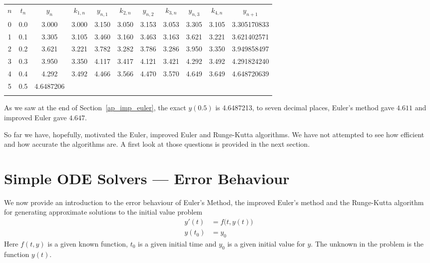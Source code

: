 \begin{center}
\def\arraystretch{1.25}%
\begin{tabular}{ !{\vrule width 1.5pt} c !{\vrule width 1pt} c | c | c | c |c | c | c | c | c | c  !{\vrule width 1.5pt}}
$n$ & $t_n$ & $y_n$ & $k_{1,n}$ & $y_{n,1}$ & $k_{2,n}$ & $y_{n,2}$ & 
       $k_{3,n}$ & $y_{n,3}$ & $k_{4,n}$ & $y_{n+1}$ \\
  0 & 0.0 & 3.000 & 3.000 & 3.150 & 3.050 & 3.153 & 3.053 & 3.305 & 3.105 & 3.305170833  \\
 & 0.1 & 3.305 & 3.105 & 3.460 & 3.160 & 3.463 & 3.163 & 3.621 & 3.221 & 3.621402571  \\
 & 0.2 & 3.621 & 3.221 & 3.782 & 3.282 & 3.786 & 3.286 & 3.950 & 3.350 & 3.949858497 \\
 & 0.3 & 3.950 & 3.350 & 4.117 & 3.417 & 4.121 & 3.421 & 4.292 & 3.492 & 4.291824240 \\
 & 0.4 & 4.292 & 3.492 & 4.466 & 3.566 & 4.470 & 3.570 & 4.649 & 3.649 & 4.648720639 \\
 & 0.5 & 4.6487206 &  & &  &  &  &  &  &   \\
\end{tabular}
\def\arraystretch{1.0}%
\end{center}
\bigskip
As we saw at the end of Section~\ref{ap_imp_euler}, the exact $y(0.5)$ is
4.6487213, to seven decimal places, Euler's method gave $4.611$ and improved Euler gave $4.647$.

So far we have, hopefully, motivated the Euler, improved Euler and Runge-Kutta
algorithms. We have not attempted to see how efficient and how accurate
the algorithms are. A first look at those questions is provided in the
next section.

\section{Simple ODE Solvers --- Error Behaviour}
We now provide an introduction to the error behaviour of 
Euler's Method, the improved Euler's method and the Runge-Kutta algorithm for
generating approximate solutions to the initial value problem
\begin{align*}
y'(t)&=f\big(t,y(t)\big) \\
y(t_0)&=y_0
\end{align*}
Here $f(t,y)$ is a given known function, $t_0$ is a given initial time and
$y_0$ is a given initial value for $y$. The unknown in the problem is the
function $y(t)$.

